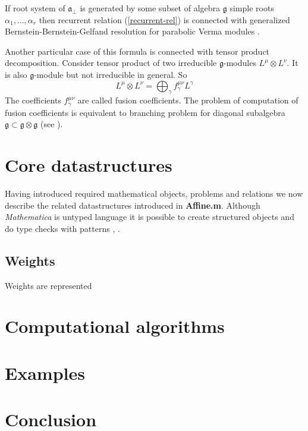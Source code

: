 \documentclass[preprint,12pt]{elsarticle}
\newcommand{\gf}{\mathfrak{g}}
\newcommand{\afb}{\mathfrak{a}_{\bot}}
\begin{document}
If root system of $\afb$ is generated by some subset of algebra $\gf$ simple roots $\alpha_{1},\dots,\alpha_{r}$ then recurrent relation (\ref{recurrent-rel}) is connected with generalized Bernstein-Bernstein-Gelfand resolution for parabolic Verma modules \cite{2011arXiv1102.1702L}.

Another particular case of this formula is connected with tensor product decomposition. Consider tensor product of two irreducible $\gf$-modules $L^{\mu}\otimes L^{\nu}$. It is also $\gf$-module but not irreducible in general. So
\begin{equation}
  \label{eq:19}
  L^{\mu}\otimes L^{\nu}=\bigoplus_{\gamma} f^{\mu\nu}_{\gamma}L^{\gamma}
\end{equation}
The coefficients $f^{\mu\nu}_{\gamma}$ are called fusion coefficients. The problem of computation of fusion coefficients is equivalent to branching problem for diagonal subalgebra $\gf\subset \gf\otimes \gf$ (see \cite{LyakhovskyPostnova2011}).

\section{Core datastructures}
\label{sec:core-datastructures}
Having introduced required mathematical objects, problems and relations we now describe the related datastructures introduced in {\bf Affine.m}. 
Although {\it Mathematica} is untyped language it is possible to create structured objects and do type checks with patterns \cite{shifrinmathematica}, \cite{maeder2000computer}. 
\subsection{Weights}
\label{sec:weights}

Weights are represented

\section{Computational algorithms}
\label{sec:comp-algor}

\section{Examples}
\label{sec:examples}

\section{Conclusion}
\label{sec:conclusion}
\end{document}

